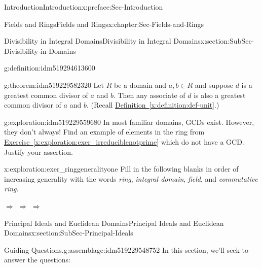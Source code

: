 \documentclass[oneside,10pt,]{book}
\newcommand{\xreffont}{\relax}
\numberwithin{equation}{section}
\begin{document}
\begin{preface}{Introduction}{}{Introduction}{}{}{x:preface:Sec-Introduction}
\begin{chapterptx}{Fields and Rings}{}{Fields and Rings}{}{}{x:chapter:Sec-Fields-and-Rings}
\begin{sectionptx}{Divisibility in Integral Domains}{}{Divisibility in Integral Domains}{}{}{x:section:SubSec-Divisibility-in-Domains}
\begin{definition}{}{g:definition:idm519294613600}
%
\end{definition}
\begin{theorem}{}{}{g:theorem:idm519229582320}%
Let \(R\) be a domain and \(a,b\in R\) and suppose \(d\) is a greatest common divisor of \(a\) and \(b\). Then any associate of \(d\) is also a greatest common divisor of \(a\) and \(b\). (Recall \hyperref[x:definition:def-unit]{Definition~{\xreffont\ref{x:definition:def-unit}}}.)%
\end{theorem}
\begin{exploration}{}{g:exploration:idm519229559680}%
In most familiar domains, GCDs exist. However, they don't always! Find an example of elements in the ring from \hyperref[x:exploration:exer_irreduciblenotprime]{Exercise~{\xreffont\ref{x:exploration:exer_irreduciblenotprime}}} which do not have a GCD. Justify your assertion.%
\end{exploration}
\begin{exploration}{}{x:exploration:exer_ringgeneralityone}%
Fill in the following blanks in order of increasing generality with the words \emph{ring}, \emph{integral domain}, \emph{field}, and \emph{commutative ring}.%
\par
\textunderscore{}\textunderscore{}\textunderscore{}\textunderscore{}\textunderscore{}\textunderscore{}\textunderscore{}\textunderscore{}\textunderscore{}\textunderscore{} \(\Rightarrow\) \textunderscore{}\textunderscore{}\textunderscore{}\textunderscore{}\textunderscore{}\textunderscore{}\textunderscore{}\textunderscore{}\textunderscore{}\textunderscore{} \(\Rightarrow\) \textunderscore{}\textunderscore{}\textunderscore{}\textunderscore{}\textunderscore{}\textunderscore{}\textunderscore{}\textunderscore{}\textunderscore{}\textunderscore{} \(\Rightarrow\) \textunderscore{}\textunderscore{}\textunderscore{}\textunderscore{}\textunderscore{}\textunderscore{}\textunderscore{}\textunderscore{}\textunderscore{}\textunderscore{}%
\end{exploration}
\end{sectionptx}
%
%
\typeout{************************************************}
\typeout{************************************************}
%
\begin{sectionptx}{Principal Ideals and Euclidean Domains}{}{Principal Ideals and Euclidean Domains}{}{}{x:section:SubSec-Principal-Ideals}
\begin{assemblage}{Guiding Questions.}{g:assemblage:idm519229548752}%
In this section, we'll seek to answer the questions: %

\end{assemblage}
\end{sectionptx}
\end{chapterptx}
\end{preface}
\end{document}
